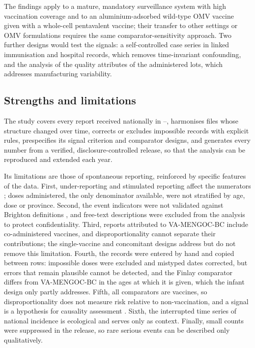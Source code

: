 \documentclass[11pt]{article}
\begin{document}
The findings apply to a mature, mandatory surveillance system with high vaccination coverage and
to an aluminium-adsorbed wild-type OMV vaccine given with a whole-cell pentavalent vaccine; their
transfer to other settings or OMV formulations requires the same comparator-sensitivity approach.
Two further designs would test the signals: a self-controlled case series in linked immunisation
and hospital records, which removes time-invariant confounding, and the analysis of the quality
attributes of the administered lots, which addresses manufacturing variability.

\subsection{Strengths and limitations}\label{sec:d-limitations}
The study covers every report received nationally in \VStudyFirstYear--\VStudyLastYear, harmonises files whose
structure changed over time, corrects or excludes impossible records with explicit rules,
prespecifies its signal criterion and comparator designs, and
generates every number from a verified, disclosure-controlled release, so that the analysis can be
reproduced and extended each year.

Its limitations are those of spontaneous reporting, reinforced by specific features of the data.
First, under-reporting and stimulated reporting affect the numerators \cite{Hazell2006,Pariente2007};
doses administered, the only denominator available, were not stratified by age, dose or province.
Second, the event indicators were not validated against Brighton definitions
\cite{Kohl2008}, and free-text descriptions were excluded from the analysis to protect
confidentiality. Third, reports attributed to VA-MENGOC-BC include co-administered vaccines, and
disproportionality cannot separate their contributions; the single-vaccine and concomitant
designs address but do not remove this limitation. Fourth, the records were entered by hand and
copied between rows: impossible doses were excluded and mistyped dates corrected, but errors that
remain plausible cannot be detected, and the Finlay comparator differs from VA-MENGOC-BC in the
ages at which it is given, which the infant design only partly addresses. Fifth, all comparators
are vaccines, so disproportionality does not
measure risk relative to non-vaccination, and a signal is a hypothesis for causality assessment
\cite{WHO2018Causality,Fusaroli2026Causal}. Sixth, the interrupted time series of national
incidence is ecological and serves only as context. Finally, small counts were suppressed in the
release, so rare serious events can be described only qualitatively.
\end{document}

